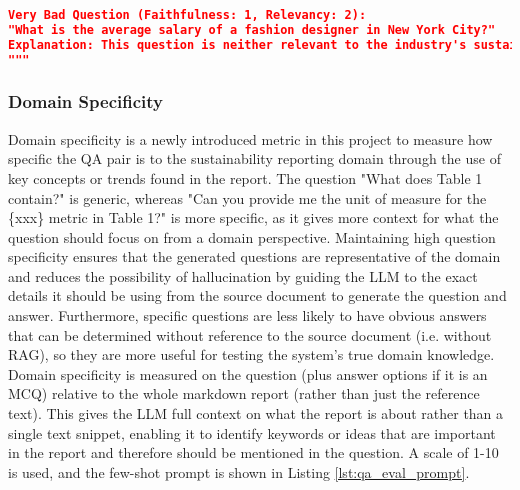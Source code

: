\begin{lstlisting}[language=JSON,firstnumber=1,label={lst:fewshot_prompt},caption={Prompt for question faithfulness/relevance evaluation}]
Very Bad Question (Faithfulness: 1, Relevancy: 2):
"What is the average salary of a fashion designer in New York City?"
Explanation: This question is neither relevant to the industry's sustainability metrics nor answerable from the given context.
"""

\end{lstlisting}

\subsubsection{Domain Specificity}

Domain specificity is a newly introduced metric in this project to measure how specific the QA pair is to the sustainability reporting domain through the use of key concepts or trends found in the report. The question "What does Table 1 contain?" is generic, whereas "Can you provide me the unit of measure for the \{xxx\} metric in Table 1?" is more specific, as it gives more context for what the question should focus on from a domain perspective. Maintaining high question specificity ensures that the generated questions are representative of the domain and reduces the possibility of hallucination by guiding the LLM to the exact details it should be using from the source document to generate the question and answer. Furthermore, specific questions are less likely to have obvious answers that can be determined without reference to the source document (i.e. without RAG), so they are more useful for testing the system's true domain knowledge. \\

Domain specificity is measured on the question (plus answer options if it is an MCQ) relative to the whole markdown report (rather than just the reference text). This gives the LLM full context on what the report is about rather than a single text snippet, enabling it to identify keywords or ideas that are important in the report and therefore should be mentioned in the question. A scale of 1-10 is used, and the few-shot prompt is shown in Listing \ref{lst:qa_eval_prompt}. 


